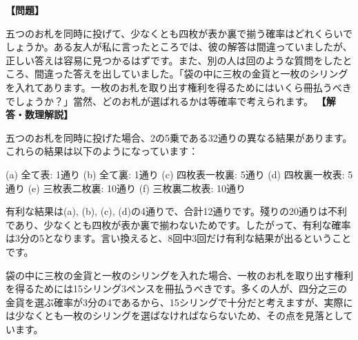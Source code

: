 \documentclass[10pt,a4paper,oneside,openany]{ltjsbook}
\begin{document}
\begin{tcolorbox}[colback=softblue,colframe=primaryblue,title=\textbf{第 30 問：確率に関する二つの質問 （原題: TWO QUESTIONS IN PROBABILITIES.）},arc=2mm,boxrule=1pt,breakable]
\textbf{【問題】}\par\vspace{0.3em}
五つのお札を同時に投げて、少なくとも四枚が表か裏で揃う確率はどれくらいでしょうか。ある友人が私に言ったところでは、彼の解答は間違っていましたが、正しい答えは容易に見つかるはずです。また、別の人は回のような質問をしたところ、間違った答えを出していました。「袋の中に三枚の金貨と一枚のシリングを入れてあります。一枚のお札を取り出す権利を得るためにはいくら冊払うべきでしょうか？」當然、どのお札が選ばれるかは等確率で考えられます。
\tcblower
\textbf{【解答・数理解説】}\par\vspace{0.3em}
五つのお札を同時に投げた場合、2の5乗である32通りの異なる結果があります。これらの結果は以下のようになっています：

(a) 全て表: 1通り
(b) 全て裏: 1通り
(c) 四枚表一枚裏: 5通り
(d) 四枚裏一枚表: 5通り
(e) 三枚表二枚裏: 10通り
(f) 三枚裏二枚表: 10通り

有利な結果は(a), (b), (c), (d)の4通りで、合計12通りです。殘りの20通りは不利であり、少なくとも四枚が表か裏で揃わないためです。したがって、有利な確率は3分の5となります。言い換えると、8回中3回だけ有利な結果が出るということです。

袋の中に三枚の金貨と一枚のシリングを入れた場合、一枚のお札を取り出す権利を得るためには15シリング3ペンスを冊払うべきです。多くの人が、四分之三の金貨を選ぶ確率が3分の4であるから、15シリングで十分だと考えますが、実際には少なくとも一枚のシリングを選ばなければならないため、その点を見落としています。
\end{tcolorbox}
\end{document}
